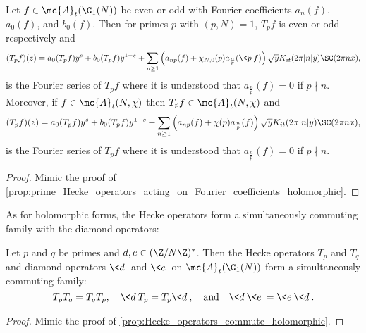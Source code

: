     \begin{proposition}\label{prop:prime_Hecke_operators_acting_on_Fourier_coefficients_Maass}
      Let $f \in \mc{A}_{t}(\G_{1}(N))$ be even or odd with Fourier coefficients $a_{n}(f)$, $a_{0}(f)$, and $b_{0}(f)$. Then for primes $p$ with $(p,N) = 1$, $T_{p}f$ is even or odd respectively and
      \[
        (T_{p}f)(z) = a_{0}(T_{p}f)y^{s}+b_{0}(T_{p}f)y^{1-s}+\sum_{n \ge 1}\left(a_{np}(f)+\chi_{N,0}(p)a_{\frac{n}{p}}(\<p\>f)\right)\sqrt{y}K_{it}(2\pi|n|y)\SC(2\pi nx),
      \]
      is the Fourier series of $T_{p}f$ where it is understood that $a_{\frac{n}{p}}(f) = 0$ if $p \nmid n$. Moreover, if $f \in \mc{A}_{t}(N,\chi)$ then $T_{p}f \in \mc{A}_{t}(N,\chi)$ and
      \[
        (T_{p}f)(z) = a_{0}(T_{p}f)y^{s}+b_{0}(T_{p}f)y^{1-s}+\sum_{n \ge 1}\left(a_{np}(f)+\chi(p)a_{\frac{n}{p}}(f)\right)\sqrt{y}K_{it}(2\pi|n|y)\SC(2\pi nx),
      \]
      is the Fourier series of $T_{p}f$ where it is understood that $a_{\frac{n}{p}}(f) = 0$ if $p \nmid n$.
    \end{proposition}
    \begin{proof}
      Mimic the proof of \cref{prop:prime_Hecke_operators_acting_on_Fourier_coefficients_holomorphic}.
    \end{proof}

    As for holomorphic forms, the Hecke operators form a simultaneously commuting family with the diamond operators:

    \begin{proposition}\label{prop:Hecke_operators_commute_Maass}
      Let $p$ and $q$ be primes and $d,e \in (\Z/N\Z)^{\ast}$. Then the Hecke operators $T_{p}$ and $T_{q}$ and diamond operators $\<d\>$ and $\<e\>$ on $\mc{A}_{t}(\G_{1}(N))$ form a simultaneously commuting family:
      \[
        T_{p}T_{q} = T_{q}T_{p}, \quad \<d\>T_{p} = T_{p}\<d\>, \quad \text{and} \quad \<d\>\<e\> = \<e\>\<d\>.
      \]
    \end{proposition}
    \begin{proof}
      Mimic the proof of \cref{prop:Hecke_operators_commute_holomorphic}.
    \end{proof}

